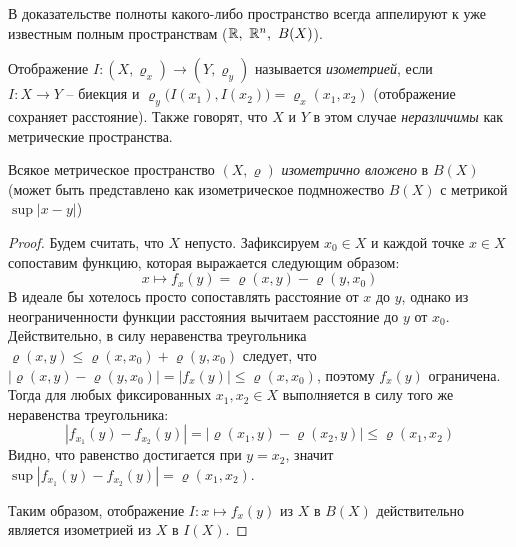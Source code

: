 \documentclass[../main.tex]{subfiles}
\begin{document}
	\begin{remark}
		В доказательстве полноты какого-либо пространство всегда аппелируют к уже известным полным пространствам ($\R, \ \R^n, \ B(X)$).
	\end{remark}
	
	\begin{definition}
		Отображение $I: (X, \varrho_x)\to(Y, \varrho_y)$ называется \textit{изометрией}, если \\
		$I: X\to Y$ -- биекция и $\varrho_y\big(I(x_1), I(x_2)\big)=\varrho_x(x_1, x_2)$ (отображение сохраняет расстояние). Также говорят, что $X$ и $Y$ в этом случае \textit{неразличимы} как метрические пространства.
	\end{definition}
	
	\begin{theorem}
		Всякое метрическое пространство $(X, \varrho)$ \textit{изометрично вложено} в $B(X)$ (может быть представлено как изометрическое подмножество $B(X)$ с метрикой $\sup|x-y|$) 
	\end{theorem}
	\begin{proof}
		Будем считать, что $X$ непусто. Зафиксируем $x_0\in X$ и каждой точке $x\in X$ сопоставим функцию, которая выражается следующим образом:
		\[
		x\mapsto f_x(y)=\varrho(x, y)-\varrho(y, x_0)
		\]
		В идеале бы хотелось просто сопоставлять расстояние от $x$ до $y$, однако из неограниченности функции расстояния вычитаем расстояние до $y$ от $x_0$. Действительно, в силу неравенства треугольника $\varrho(x, y)\leqslant \varrho(x, x_0)+\varrho(y, x_0)$ следует, что $|\varrho(x, y)-\varrho(y, x_0)|=|f_x(y)|\leqslant \varrho(x, x_0)$, поэтому $f_x(y)$ ограничена. Тогда для любых фиксированных $x_1, x_2\in X$ выполняется в силу того же неравенства треугольника:
		\[
		|f_{x_1}(y)-f_{x_2}(y)|=|\varrho(x_1, y)-\varrho(x_2, y)|\leqslant \varrho(x_1, x_2)
		\]
		Видно, что равенство достигается при $y=x_2$, значит $\sup|f_{x_1}(y)-f_{x_2}(y)|=\varrho(x_1, x_2)$. 
		
		Таким образом, отображение $I: x\mapsto f_x(y)$ из $X$ в $B(X)$ действительно является изометрией из $X$ в $I(X)$.
	\end{proof}
	
\end{document}

